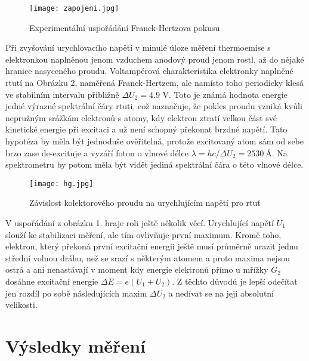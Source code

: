 \documentclass[a4paper,11pt]{article}
\begin{document}
\begin{figure}[htpb]
    \centering
    \texttt{[image: zapojeni.jpg]}
    \caption{Experimentální uspořádání Franck-Hertzova pokusu}
\end{figure}


Při zvyšování urychlovacího napětí v minulé úloze měření thermoemise s elektronkou naplněnou jenom vzduchem anodový proud jenom rostl, až do nějaké hranice nasyceného proudu. Voltampérová charakteristika elektronky naplněné rtutí na Obrázku 2, naměřená Franck-Hertzem, ale namísto toho periodicky klesá ve stabilním intervalu přibližně $ \Delta U_2 = 4.9 $ V. Toto je známá hodnota energie jedné výrazné spektrální čáry rtuti, což naznačuje, že pokles proudu vzniká kvůli nepružným srážkám elektronů s atomy, kdy elektron ztratí velkou část své kinetické energie při excitaci a už není schopný překonat brzdné napětí. Tato hypotéza by měla být jednoduše ověřitelná, protože excitovaný atom sám od sebe brzo zase de-excituje a vyzáří foton o vlnové délce $ \lambda = hc / \Delta U_2 = 2530 \ \si{\angstrom}$. Na spektrometru by potom měla být vidět jediná spektrální čára o této vlnové délce. 


\begin{figure}[htpb]
    \centering
    \texttt{[image: hg.jpg]}
    \caption{Závislost kolektorového proudu na urychlujícím napětí pro rtuť}
\end{figure}

V uspořádání z obrázku 1. hraje roli ještě několik věcí. Urychlující napětí $ U_1 $ slouží ke stabilizaci měření, ale tím ovlivňuje první maximum. Kromě toho, elektron, který překoná první excitační energii ještě musí průměrně urazit jednu střední volnou dráhu, než se srazí s některým atomem a proto maxima nejsou ostrá a ani nenastávají v moment kdy energie elektronů přímo u mřížky $ G_2 $ dosáhne excitační energie $ \Delta E = e( U_1 + U_2 )$. Z těchto důvodů je lepší odečítat jen rozdíl po sobě následujících maxim $ \Delta U_2 $ a nedívat se na jeji absolutní velikosti. 

\section{Výsledky měření}
\end{document}
